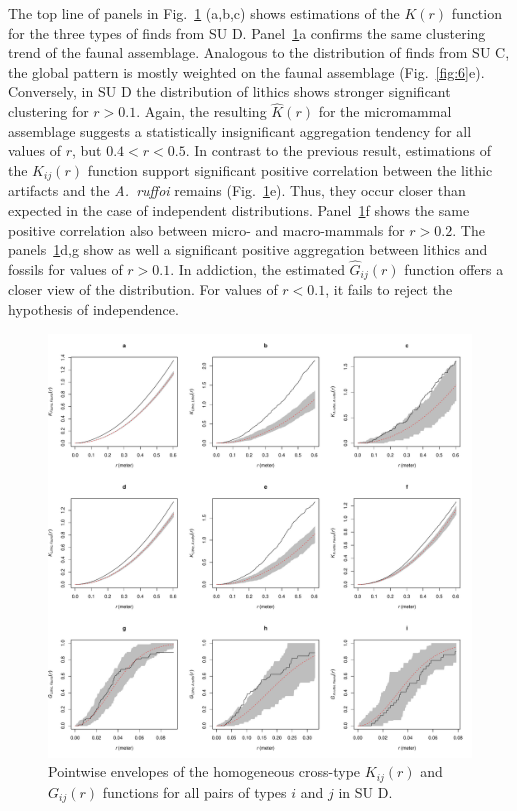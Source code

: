 \documentclass[review,authoryear]{elsarticle} %
\begin{document}
The top line of panels in Fig.~\ref{fig:8} (a,b,c) shows estimations of the $K(r)$ function for the three types of finds from SU D. Panel~\ref{fig:8}a confirms the same clustering trend of the faunal assemblage. Analogous to the distribution of finds from SU C, the global pattern is mostly weighted on the faunal assemblage (Fig.~\ref{fig:6}e). Conversely, in SU D the distribution of lithics shows stronger significant clustering for $r>0.1$. Again, the resulting $\hat{K}(r)$ for the micromammal assemblage suggests a statistically insignificant aggregation tendency for all values of $r$, but $0.4<r<0.5$. In contrast to the previous result, estimations of the $K_{ij}(r)$ function support significant positive correlation between the lithic artifacts and the \emph{A.~ruffoi} remains (Fig.~\ref{fig:8}e). Thus, they occur closer than expected in the case of independent distributions. Panel~\ref{fig:8}f shows the same positive correlation also between micro- and macro-mammals for $r>0.2$. The panels~\ref{fig:8}d,g show as well a significant positive aggregation between lithics and fossils for values of $r>0.1$. In addiction, the estimated $\hat G_{ij}(r)$ function offers a closer view of the distribution. For values of $r<0.1$, it fails to reject the hypothesis of independence.

\begin{figure}
  \centering
  \includegraphics[width=1\textwidth]{../artwork/Fig8.pdf}
  \caption{Pointwise envelopes of the homogeneous cross-type $K_{ij}(r)$ and $G_{ij}(r)$ functions for all pairs of types $i$ and $j$ in SU D.}
  \label{fig:8}
\end{figure}
\end{document}
